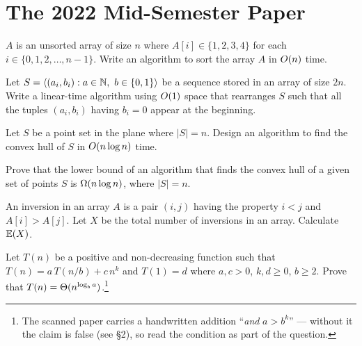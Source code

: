 \section{The 2022 Mid-Semester Paper}

\setcounter{pq}{0}

\begin{center}
\end{center}

 $A$ is an unsorted array of size $n$ where $A[i]\in\{1,2,3,4\}$ for each
$i\in\{0,1,2,\dots,n-1\}$. Write an algorithm to sort the array $A$ in $O(n)$ time.

 Let $S=\langle(a_i,b_i):a\in\N,\ b\in\{0,1\}\rangle$ be a sequence stored in an array of
size $2n$. Write a linear-time algorithm using $O(1)$ space that rearranges $S$ such that all
the tuples $(a_i,b_i)$ having $b_i=0$ appear at the beginning.

 Let $S$ be a point set in the plane where $|S|=n$. Design an algorithm to find the convex
hull of $S$ in $O(n\log n)$ time.

 Prove that the lower bound of an algorithm that finds the convex hull of a given set of
points $S$ is $\Omega(n\log n)$, where $|S|=n$.

 An inversion in an array $A$ is a pair $(i,j)$ having the property $i<j$ and $A[i]>A[j]$.
Let $X$ be the total number of inversions in an array. Calculate $\mathbb{E}(X)$.

 Let $T(n)$ be a positive and non-decreasing function such that $T(n)=a\,T(n/b)+c\,n^k$
and $T(1)=d$ where $a,c>0$, $k,d\ge0$, $b\ge2$. Prove that
$T(n)=\Theta(n^{\log_b a})$.\footnote{The scanned paper carries a handwritten addition
``\emph{and} $a>b^k$'' --- without it the claim is false (see \S2), so read the condition as
part of the question.}

